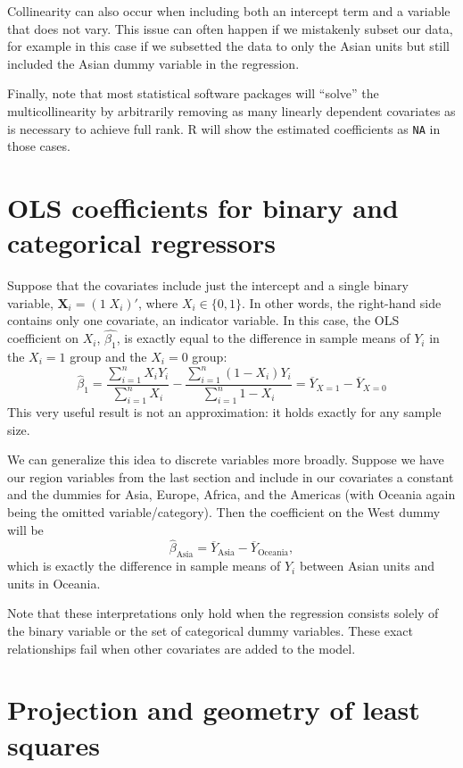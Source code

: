 \documentclass[
  13pt,
  letterpaper,
  DIV=11,
  numbers=noendperiod]{scrreprt}
\newcommand{\mb}{\symbf}
\newcommand{\X}{\mb{X}}
\theoremstyle{definition}
\theoremstyle{definition}
\theoremstyle{plain}
\theoremstyle{remark}
\begin{document}
Collinearity can also occur when including both an intercept term and a
variable that does not vary. This issue can often happen if we
mistakenly subset our data, for example in this case if we subsetted the
data to only the Asian units but still included the Asian dummy variable
in the regression.

Finally, note that most statistical software packages will ``solve'' the
multicollinearity by arbitrarily removing as many linearly dependent
covariates as is necessary to achieve full rank. R will show the
estimated coefficients as \texttt{NA} in those cases.

\section{OLS coefficients for binary and categorical
regressors}\label{ols-coefficients-for-binary-and-categorical-regressors}

Suppose that the covariates include just the intercept and a single
binary variable, \(\X_i = (1\; X_{i})'\), where \(X_i \in \{0,1\}\). In
other words, the right-hand side contains only one covariate, an
indicator variable. In this case, the OLS coefficient on \(X_i\),
\(\widehat{\beta_{1}}\), is exactly equal to the difference in sample
means of \(Y_i\) in the \(X_i = 1\) group and the \(X_i = 0\) group: \[ 
\widehat{\beta}_{1} = \frac{\sum_{i=1}^{n} X_{i}Y_{i}}{\sum_{i=1}^{n} X_{i}} - \frac{\sum_{i=1}^{n} (1 - X_{i})Y_{i}}{\sum_{i=1}^{n} 1- X_{i}} = \overline{Y}_{X =1} - \overline{Y}_{X=0}
\] This very useful result is not an approximation: it holds exactly for
any sample size.

We can generalize this idea to discrete variables more broadly. Suppose
we have our region variables from the last section and include in our
covariates a constant and the dummies for Asia, Europe, Africa, and the
Americas (with Oceania again being the omitted variable/category). Then
the coefficient on the West dummy will be \[ 
\widehat{\beta}_{\text{Asia}} = \overline{Y}_{\text{Asia}} - \overline{Y}_{\text{Oceania}},
\] which is exactly the difference in sample means of \(Y_i\) between
Asian units and units in Oceania.

Note that these interpretations only hold when the regression consists
solely of the binary variable or the set of categorical dummy variables.
These exact relationships fail when other covariates are added to the
model.

\section{Projection and geometry of least
squares}\label{projection-and-geometry-of-least-squares}
\end{document}
